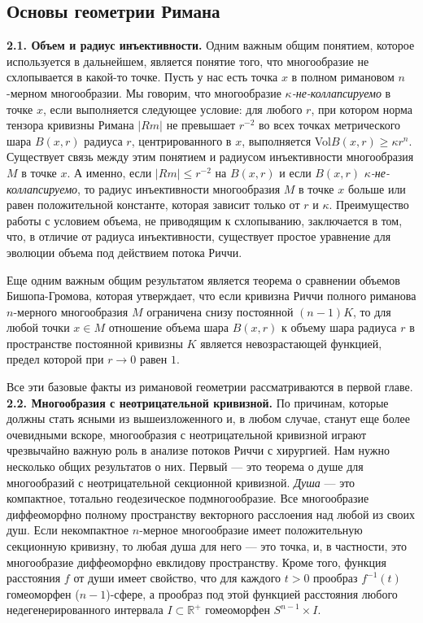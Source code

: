 \subsection{Основы геометрии Римана}

\textbf{2.1. Объем и радиус инъективности.} Одним важным общим понятием, которое 
используется в дальнейшем, является понятие того, что многообразие не схлопывается 
в какой-то точке. Пусть у нас есть точка $x$ в полном римановом $n$-мерном многообразии. 
Мы говорим, что многообразие \textit{$\kappa $-не-коллапсируемо} в точке $x$, если 
выполняется следующее условие: для любого $r$, при котором норма тензора кривизны Римана
$| Rm| $ не превышает $r^{-2}$ во всех точках метрического шара $B(x,r)$ радиуса $r$, центрированного 
в $x$, выполняется Vol$B(x,r)\geq \kappa r^{n}$. Существует связь между этим понятием и радиусом 
инъективности многообразия $M$ в точке $x$. А именно, если $| Rm| \leq r^{-2}$ на $B(x,r)$ и если 
$B(x,r)$ \textit{$\kappa $-не-коллапсируемо}, то радиус инъективности многообразия $M$ в точке 
$x$ больше или равен положительной константе, которая зависит только от $r$ и $\kappa $. 
Преимущество работы с условием объема, не приводящим к схлопыванию, заключается в том, 
что, в отличие от радиуса инъективности, существует простое уравнение для эволюции объема 
под действием потока Риччи.

Еще одним важным общим результатом является теорема о сравнении объемов Бишопа-Громова, 
которая утверждает, что если кривизна Риччи полного риманова $n$-мерного многообразия $M$ 
ограничена снизу постоянной $(n-1)K$, то для любой точки $x\in M$ отношение объема шара 
$B(x,r)$ к объему шара радиуса $r$ в пространстве постоянной кривизны $K$ является 
невозрастающей функцией, предел которой при $r\rightarrow 0$ равен $1$. 

Все эти базовые факты из римановой геометрии рассматриваются в первой главе.\\


\textbf{2.2. Многообразия с неотрицательной кривизной.} По причинам, которые должны стать 
ясными из вышеизложенного и, в любом случае, станут еще более очевидными вскоре, 
многообразия с неотрицательной кривизной играют чрезвычайно важную роль в анализе 
потоков Риччи с хирургией. Нам нужно несколько общих результатов о них. 
Первый — это теорема о душе для многообразий с неотрицательной секционной кривизной. 
\textit{Душа} — это компактное, тотально геодезическое подмногообразие. Все многообразие 
диффеоморфно полному пространству векторного расслоения над любой из своих душ. 
Если некомпактное $n$-мерное многообразие имеет положительную секционную кривизну, 
то любая душа для него — это точка, и, в частности, это многообразие диффеоморфно 
евклидову пространству. Кроме того, функция расстояния $f$ от души имеет свойство, 
что для каждого $t > 0$ прообраз $f^{-1} (t)$ гомеоморфен ($n-1$)-сфере, а прообраз под 
этой функцией расстояния любого недегенерированного интервала $I\subset \mathbb{R}^{+}$ гомеоморфен 
$S^{n-1} \times I$.

